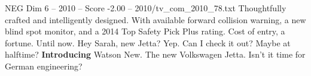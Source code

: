 \begin{textsample}{NEG Dim 6 – 2010 – Score -2.00 – 2010/tv\_com\_2010\_78.txt}  \label{ex:f6_neg_042}
Thoughtfully crafted and intelligently designed.
With available forward collision warning, a new blind spot monitor, and a 2014 Top Safety Pick Plus rating.
Cost of entry, a fortune.
Until now.
Hey Sarah, new Jetta?
Yep.
Can I check it out?
Maybe at halftime? \textbf{Introducing} Watson New.
The new Volkswagen Jetta.
Isn't it time for German engineering?

\end{textsample}
